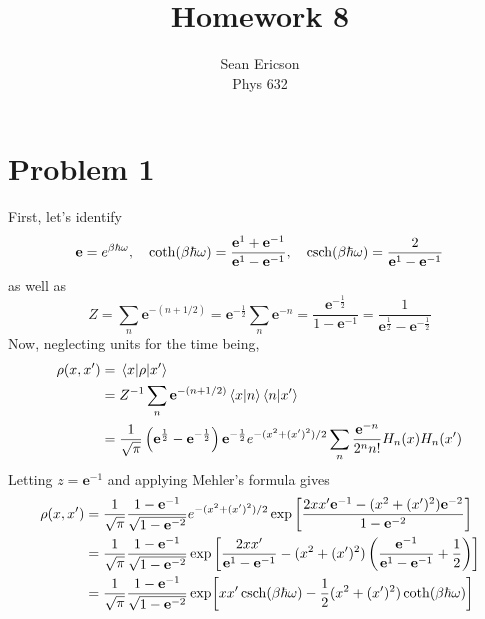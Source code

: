 \documentclass[12pt]{article}
\newcommand{\e}{\mathbf{e}}
\begin{document}
	
\title{Homework 8}
\author{Sean Ericson \\ Phys 632}
\maketitle

\section*{Problem 1}
First, let's identify
\[ \e = e^{\beta\hbar\omega}, \quad \coth(\beta\hbar\omega) = \frac{\e^1 + \e^{-1}}{\e^1 - \e^{-1}}, \quad \csch(\beta\hbar\omega) = \frac{2}{\e^1 - \e^{-1}} \]
as well as
\[ Z = \sum_n\e^{-(n+1/2)} = \e^{-\frac{1}{2}}\sum_n\e^{-n} = \frac{\e^{-\frac{1}{2}}}{1 - \e^{-1}} = \frac{1}{\e^\frac{1}{2} - \e^{-\frac{1}{2}}} \]
Now, neglecting units for the time being,
\begin{align*}
    \rho(x,x') &= \mel{x}{\rho}{x'} \\
    &= Z^{-1}\sum_n \e^{-(n+1/2)}\braket{x}{n}\braket{n}{x'} \\
    &= \frac{1}{\sqrt{\pi}}\left(\e^\frac{1}{2} - \e^{-\frac{1}{2}}\right)\e^{-\frac{1}{2}} e^{-(x^2 + (x')^2)/2}\sum_n\frac{\e^{-n}}{2^n n!}H_n(x)H_n(x') \\
\end{align*}
Letting $z = \e^{-1}$ and applying Mehler's formula gives
\begin{align*}
    \rho(x,x') &= \frac{1}{\sqrt{\pi}}\frac{1 - \e^{-1}}{\sqrt{1 - \e^{-2}}}e^{-(x^2 + (x')^2)/2}\exp\left[\frac{2xx'\e^{-1} - (x^2 + (x')^2)\e^{-2}}{1 - \e^{-2}}\right] \\
    &= \frac{1}{\sqrt{\pi}}\frac{1 - \e^{-1}}{\sqrt{1 - \e^{-2}}}\exp\left[\frac{2xx'}{\e^{1} - \e^{-1}} - (x^2 + (x')^2)\left(\frac{\e^{-1}}{\e^1 - \e^{-1}} + \frac{1}{2}\right)\right] \\
    &= \frac{1}{\sqrt{\pi}}\frac{1 - \e^{-1}}{\sqrt{1 - \e^{-2}}}\exp[xx'\csch(\beta\hbar\omega) - \frac{1}{2}(x^2 + (x')^2)\coth(\beta\hbar\omega)]
\end{align*}
\end{document}
